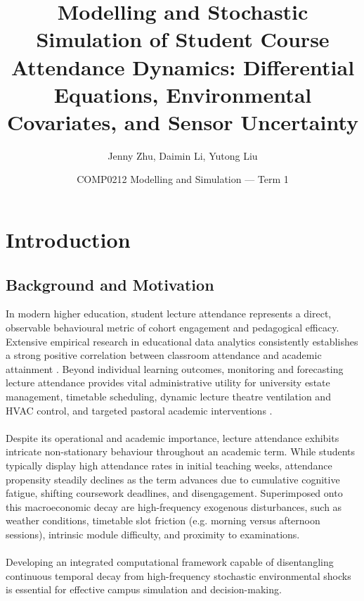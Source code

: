 \documentclass{article}
\title{\textbf{Modelling and Stochastic Simulation of Student Course Attendance Dynamics: Differential Equations, Environmental Covariates, and Sensor Uncertainty}}
\author{Jenny Zhu, Daimin Li, Yutong Liu}
\date{COMP0212 Modelling and Simulation --- Term 1}
\begin{document}
\maketitle
\tableofcontents
\clearpage

\section{Introduction}

\subsection{Background and Motivation}
In modern higher education, student lecture attendance represents a direct, observable behavioural metric of cohort engagement and pedagogical efficacy. Extensive empirical research in educational data analytics consistently establishes a strong positive correlation between classroom attendance and academic attainment \cite{crede2010,kahu2013,marburger2006,arulampalam2012}. Beyond individual learning outcomes, monitoring and forecasting lecture attendance provides vital administrative utility for university estate management, timetable scheduling, dynamic lecture theatre ventilation and HVAC control, and targeted pastoral academic interventions \cite{newmanford2008}.\\
\\
Despite its operational and academic importance, lecture attendance exhibits intricate non-stationary behaviour throughout an academic term. While students typically display high attendance rates in initial teaching weeks, attendance propensity steadily declines as the term advances due to cumulative cognitive fatigue, shifting coursework deadlines, and disengagement. Superimposed onto this macroeconomic decay are high-frequency exogenous disturbances, such as weather conditions, timetable slot friction (e.g. morning versus afternoon sessions), intrinsic module difficulty, and proximity to examinations. \\
\\
Developing an integrated computational framework capable of disentangling continuous temporal decay from high-frequency stochastic environmental shocks is essential for effective campus simulation and decision-making.
\end{document}
